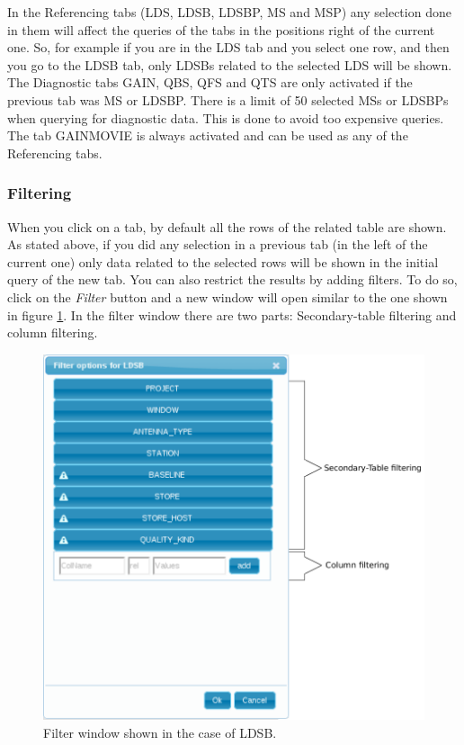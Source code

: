 \documentclass[a4paper,11pt]{article}
\begin{document}
In the Referencing tabs (LDS, LDSB, LDSBP, MS and MSP) any selection done in them will affect the queries of the tabs in the positions right of the current one. So, for example if you are in the LDS tab and you select one row, and then you go to the LDSB tab, only LDSBs related to the selected LDS will be shown. \\

The Diagnostic tabs GAIN, QBS, QFS and QTS are only activated if the previous tab was MS or LDSBP. There is a limit of 50 selected MSs or LDSBPs when querying for diagnostic data. This is done to avoid too expensive queries. The tab GAINMOVIE is always activated and can be used as any of the Referencing tabs.

\subsubsection{Filtering}
\label{sec:filtering}

When you click on a tab, by default all the rows of the related table are shown. As stated above, if you did any selection in a previous tab (in the left of the current one) only data related to the selected rows will be shown in the initial query of the new tab. You can also restrict the results by adding filters. To do so, click on the \textit{Filter} button and a new window will open similar to the one shown in figure \ref{fig:filterexample}. In the filter window there are two parts: Secondary-table filtering and column filtering. 

\begin{figure}[h]
	\centering
	\includegraphics[scale=0.30]{fig/filterexample} 
	\caption{Filter window shown in the case of LDSB.}
	\label{fig:filterexample}
\end{figure}
\end{document}

